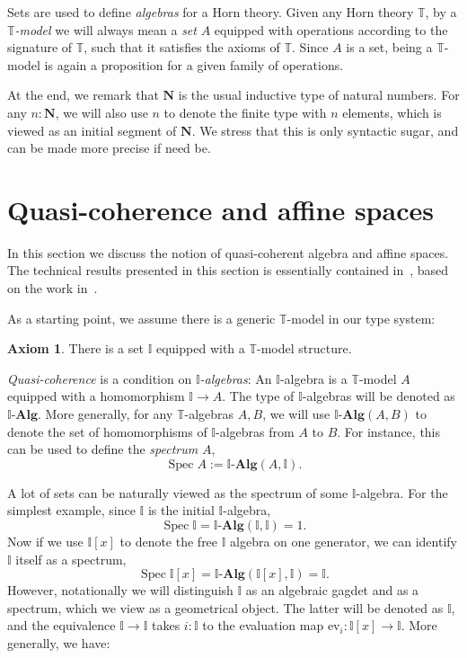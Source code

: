 \documentclass[12pt]{amsart}
\theoremstyle{definition}
\newtheorem{axiom}{Axiom}
\newcommand{\mb}[1]{\mathbf{#1}}
\newcommand{\mbb}[1]{\mathbb{#1}}
\newcommand{\T}{\mbb T}
\newcommand{\I}{\mbb I}
\newcommand{\alg}{\text{-}\mb{Alg}}
\newcommand{\ev}{\mathrm{ev}}
\newcommand{\N}{\mb N}
\newcommand{\spec}{\operatorname{Spec}}
\begin{document}
Sets are used to define \emph{algebras} for a Horn theory. Given any Horn theory $\T$, by a \emph{$\T$-model} we will always mean a \emph{set} $A$ equipped with operations according to the signature of $\T$, such that it satisfies the axioms of $\T$. Since $A$ is a set, being a $\T$-model is again a proposition for a given family of operations.

At the end, we remark that $\N$ is the usual inductive type of natural numbers. For any $n:\N$, we will also use $n$ to denote the finite type with $n$ elements, which is viewed as an initial segment of $\N$. We stress that this is only syntactic sugar, and can be made more precise if need be.


\section{Quasi-coherence and affine spaces}

In this section we discuss the notion of quasi-coherent algebra and affine spaces. The technical results presented in this section is essentially contained in~\cite{Cherubini_Coquand_Hutzler_2024}, based on the work in~\cite{blechschmidt2021using}. 

As a starting point, we assume there is a generic $\T$-model in our type system:

\begin{axiom}
  There is a set $\I$ equipped with a $\T$-model structure.
\end{axiom}

\emph{Quasi-coherence} is a condition on \emph{$\I$-algebras}: An $\I$-algebra is a $\T$-model $A$ equipped with a homomorphism $\I \to A$. The type of $\I$-algebras will be denoted as $\I\alg$. More generally, for any $\T$-algebras $A,B$, we will use $\I\alg(A,B)$ to denote the set of homomorphisms of $\I$-algebras from $A$ to $B$. For instance, this can be used to define the \emph{spectrum} $A$,
\[ \spec A := \I\alg(A,\I). \]

A lot of sets can be naturally viewed as the spectrum of some $\I$-algebra. For the simplest example, since $\I$ is the initial $\I$-algebra,
\[ \spec \I = \I\alg(\I,\I) = 1. \]
Now if we use $\I[x]$ to denote the free $\I$ algebra on one generator, we can identify $\I$ itself as a spectrum,
\[ \spec \I[x] = \I\alg(\I[x],\I) = \I. \]
However, notationally we will distinguish $\I$ as an algebraic gagdet and as a spectrum, which we view as a geometrical object. The latter will be denoted as $\I$, and the equivalence $\I \to \I$ takes $i : \I$ to the evaluation map $\ev_i : \I[x] \to \I$. More generally, we have:
\end{document}
